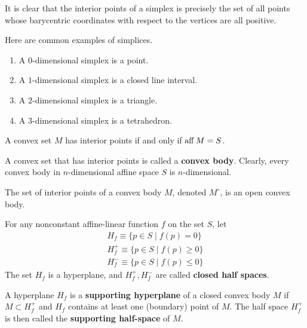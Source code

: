   It is clear that the interior points of a simplex is precisely the set of all points whose barycentric coordinates with respect to the vertices are all positive. 

  \begin{example}
    Here are common examples of simplices.
    \begin{enumerate}
      \item A $0$-dimensional simplex is a point. 
      \item A $1$-dimensional simplex is a closed line interval. 
      \item A $2$-dimensional simplex is a triangle. 
      \item A $3$-dimensional simplex is a tetrahedron. 
    \end{enumerate}
  \end{example}

  \begin{proposition}
    A convex set $M$ has interior points if and only if $\operatorname{aff} M = S$. 
  \end{proposition}

  \begin{definition}
    A convex set that has interior points is called a \textbf{convex body}. Clearly, every convex body in $n$-dimensional affine space $S$ is $n$-dimensional. 
  \end{definition}

  The set of interior points of a convex body $M$, denoted $M^\circ$, is an open convex body. 

  \begin{definition}
    For any nonconstant affine-linear function $f$ on the set $S$, let
    \begin{align*}
      H_f \equiv \{p \in S \;|\; f(p) = 0\} \\
      H^+_f \equiv \{p \in S \;|\; f(p) \geq 0\} \\
      H^-_f \equiv \{p \in S \;|\; f(p) \leq 0\}
    \end{align*}
    The set $H_f$ is a hyperplane, and $H^+_f, H^-_f$ are called \textbf{closed half spaces}. 
  \end{definition}

  \begin{definition}
    A hyperplane $H_f$ is a \textbf{supporting hyperplane} of a closed convex body $M$ if $M \subset H^+_f$ and $H_f$ contains at least one (boundary) point of $M$. The half space $H^+_f$ is then called the \textbf{supporting half-space} of $M$. 
  \end{definition}

